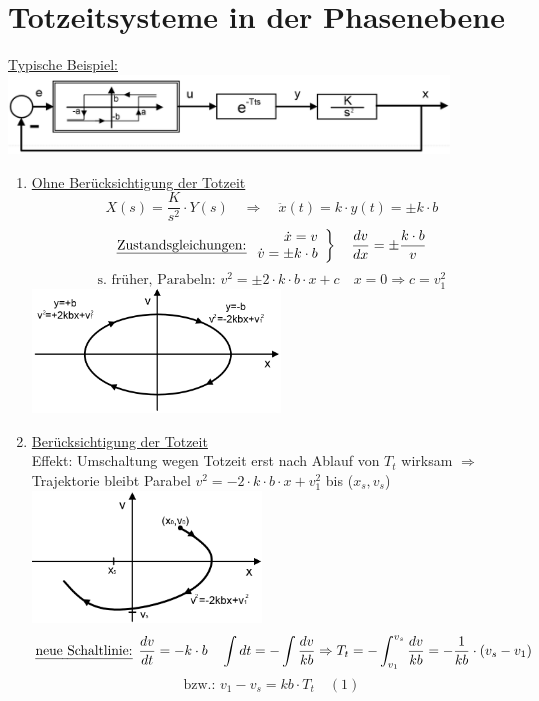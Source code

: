 \documentclass[openany,a4paper,11pt]{book}
\begin{document}
\section{Totzeitsysteme in der Phasenebene}
\uline{Typische Beispiel:}\\
\includegraphics[width=4.6in]{imgs/NLR28.png}
\begin{enumerate}
    \item \uline{Ohne Berücksichtigung der Totzeit}
    \[X(s)=\frac{K}{s^2}\cdot Y(s) \quad \Rightarrow \quad \ddot{x}(t)=k\cdot y(t)=\pm k\cdot b\]
    \[\text{\uline{Zustandsgleichungen:}}
    \left.
    \begin{array}{r}
    \dot{x}=v\\
    \dot{v}=\pm k\cdot b
    \end{array}
    \right\} \quad \frac{dv}{dx}=\pm \frac{k\cdot b}{v}\]
    \[\text{s. früher, Parabeln: } v^2=\pm2\cdot k\cdot b\cdot x +c \quad x=0 \Rightarrow c=v_1^2\]
    \includegraphics[width=2.6in]{imgs/NLR29.png}
    \item \uline{Berücksichtigung der Totzeit}\\
    Effekt: Umschaltung wegen Totzeit erst nach Ablauf von $T_t$ wirksam $\Rightarrow$ Trajektorie bleibt Parabel $v^2=-2\cdot k\cdot b\cdot x +v_1^2$ bis ($x_s,v_s$)\\
    \includegraphics[width=2.4in]{imgs/NLR30.png}
    \[\text{\uline{neue Schaltlinie:}  } \frac{dv}{dt}=-k\cdot b \quad \int dt=-\int \frac{dv}{kb} \Rightarrow T_t=-\int_{v_1}^{v_s} \frac{dv}{kb}=-\frac{1}{kb}\cdot (v_s-v_1)\]
    \[ \text{bzw.: } v_1-v_s = kb\cdot T_t \quad (1)\]

\end{enumerate}
\end{document}
